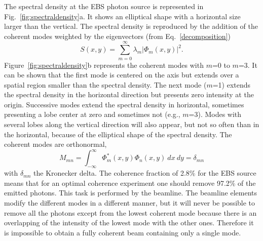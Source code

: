 \documentclass{iucr}              %
\newcommand{\inred}[1]{{\color{black}#1}}
\begin{document}
The spectral density at the EBS photon source is represented in Fig.~\ref{fig:spectraldensity}a. It shows an elliptical shape with a horizontal size larger than the vertical.  The spectral density is reproduced by the addition of the coherent modes weighted by the eigenvectors (from Eq.~\ref{decomposition})
\begin{equation}
S(x,y) = \sum_{m=0}^{\infty} \lambda_m |\Phi_m(x,y)|^2.
\end{equation}
Figure~\ref{fig:spectraldensity}b represents the coherent modes with $m$=0 to $m$=3. It can be shown that the first mode is centered on the axis but extends over a spatial region smaller than the spectral density. The next mode ($m$=1) \inred{extends the spectral density in the horizontal direction} but presents zero intensity at the origin. Successive modes extend the spectral density in horizontal, sometimes presenting a lobe center at zero and sometimes not (e.g., $m$=3). Modes with several lobes along the vertical \inred{direction} will also appear, but not so often than in the horizontal, because of the elliptical shape of the spectral density. The coherent modes are orthonormal, 
\begin{equation}\label{eq:mode normalization}
M_{mn} = \int_{-\infty}^{\infty} \Phi^*_m(x,y) \Phi_n(x,y)~dx~dy = \delta_{mn}
\end{equation}
with $\delta_{mn}$ the Kronecker delta. The coherence fraction of 2.8\% for the EBS source means that for an optimal coherence experiment one should remove 97.2\% of the emitted photons. This task is performed by the beamline. The beamline elements modify the different modes in a different manner, but it will never be possible to remove all the photons except from the lowest coherent mode because there is an overlapping of the intensity of the lowest mode with the other ones. Therefore it is impossible to obtain a fully coherent beam containing only a single mode. 
\end{document}
